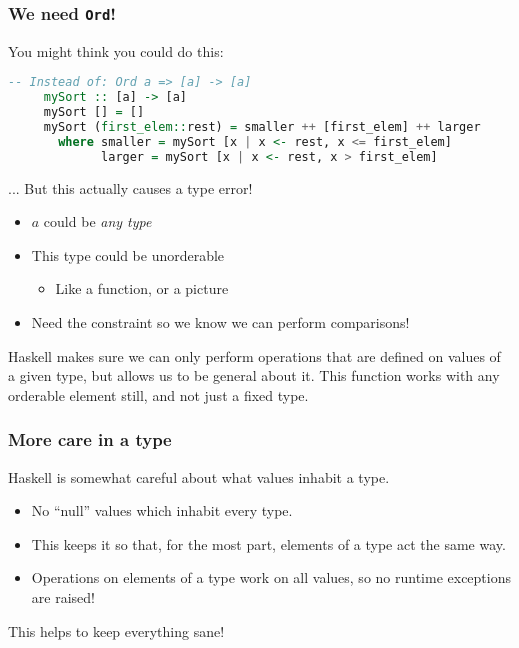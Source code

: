 \documentclass{beamer}
\begin{document}
\begin{frame}[fragile]
  \frametitle{We need \texttt{Ord}!}
  You might think you could do this:

  \begin{lstlisting}[frame=single, language=Haskell, breaklines=true, basicstyle=\ttfamily\tiny]
     -- Instead of: Ord a => [a] -> [a]
     mySort :: [a] -> [a]
     mySort [] = []
     mySort (first_elem::rest) = smaller ++ [first_elem] ++ larger
       where smaller = mySort [x | x <- rest, x <= first_elem]
             larger = mySort [x | x <- rest, x > first_elem]
   \end{lstlisting}

   \pause

   ... But this actually causes a type error!

   \pause

   \begin{itemize}
   \item $a$ could be \emph{any type}
   \item This type could be unorderable
     \begin{itemize}
     \item Like a function, or a picture
     \end{itemize}
   \item Need the constraint so we know we can perform comparisons!
   \end{itemize}

   \pause

   Haskell makes sure we can only perform operations that are defined on values of a given type, but allows us to be general about it. This function works with any orderable element still, and not just a fixed type.
   
\end{frame}

\begin{frame}
  \frametitle{More care in a type}

  Haskell is somewhat careful about what values inhabit a type.

  \pause
  \begin{itemize}
  \item No ``null'' values which inhabit every type.
  \pause
  \item This keeps it so that, for the most part, elements of a type act the same way.
  \pause
  \item Operations on elements of a type work on all values, so no runtime exceptions are raised!
  \end{itemize}

  \pause

  This helps to keep everything sane!
\end{frame}
\end{document}
